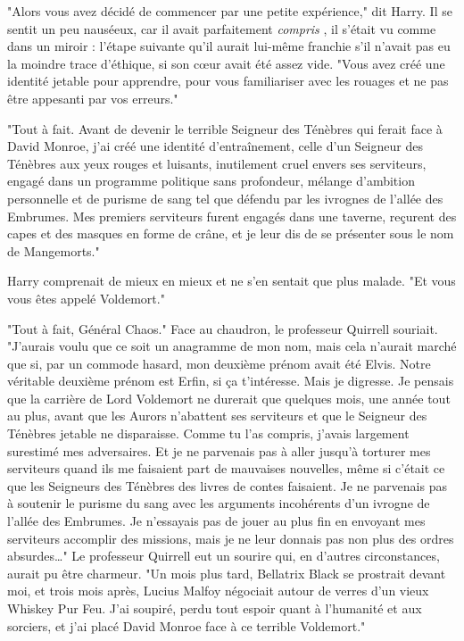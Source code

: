 "Alors vous avez décidé de commencer par une petite expérience," dit Harry. Il se sentit un peu nauséeux, car il avait parfaitement \emph{compris} , il s'était vu comme dans un miroir : l'étape suivante qu'il aurait lui-même franchie s'il n'avait pas eu la moindre trace d'éthique, si son cœur avait été assez vide. "Vous avez créé une identité jetable pour apprendre, pour vous familiariser avec les rouages et ne pas être appesanti par vos erreurs."

"Tout à fait. Avant de devenir le terrible Seigneur des Ténèbres qui ferait face à David Monroe, j'ai créé une identité d'entraînement, celle d'un Seigneur des Ténèbres aux yeux rouges et luisants, inutilement cruel envers ses serviteurs, engagé dans un programme politique sans profondeur, mélange d'ambition personnelle et de purisme de sang tel que défendu par les ivrognes de l'allée des Embrumes. Mes premiers serviteurs furent engagés dans une taverne, reçurent des capes et des masques en forme de crâne, et je leur dis de se présenter sous le nom de Mangemorts."

Harry comprenait de mieux en mieux et ne s'en sentait que plus malade. "Et vous vous êtes appelé Voldemort."

"Tout à fait, Général Chaos." Face au chaudron, le professeur Quirrell souriait. "J'aurais voulu que ce soit un anagramme de mon nom, mais cela n'aurait marché que si, par un commode hasard, mon deuxième prénom avait été Elvis. Notre véritable deuxième prénom est Erfin, si ça t'intéresse. Mais je digresse. Je pensais que la carrière de Lord Voldemort ne durerait que quelques mois, une année tout au plus, avant que les Aurors n'abattent ses serviteurs et que le Seigneur des Ténèbres jetable ne disparaisse. Comme tu l'as compris, j'avais largement surestimé mes adversaires. Et je ne parvenais pas à aller jusqu'à torturer mes serviteurs quand ils me faisaient part de mauvaises nouvelles, même si c'était ce que les Seigneurs des Ténèbres des livres de contes faisaient. Je ne parvenais pas à soutenir le purisme du sang avec les arguments incohérents d'un ivrogne de l'allée des Embrumes. Je n'essayais pas de jouer au plus fin en envoyant mes serviteurs accomplir des missions, mais je ne leur donnais pas non plus des ordres absurdes…" Le professeur Quirrell eut un sourire qui, en d'autres circonstances, aurait pu être charmeur. "Un mois plus tard, Bellatrix Black se prostrait devant moi, et trois mois après, Lucius Malfoy négociait autour de verres d'un vieux Whiskey Pur Feu. J'ai soupiré, perdu tout espoir quant à l'humanité et aux sorciers, et j'ai placé David Monroe face à ce terrible Voldemort."

